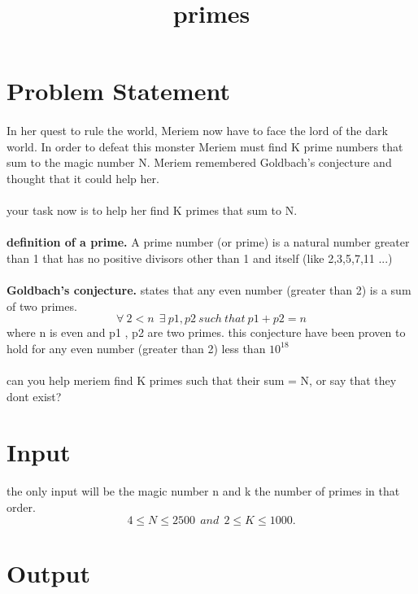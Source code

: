 \documentclass[10pt]{article}
\begin{document}
\title{primes}
 \date{}
\maketitle

\section{Problem Statement}
\paragraph{}
In her quest to rule the world, Meriem now have to face the lord of the dark world.
In order to defeat this monster Meriem must find K prime numbers that sum to the
magic number N. Meriem remembered Goldbach's conjecture and thought that it could help her.
\paragraph{}
your task now is to help her find K primes that sum to N.
\paragraph{}
\textbf{definition of a prime.}
A prime number (or prime) is a natural number greater than 1 that has no positive divisors other than 1 and itself
(like 2,3,5,7,11 ...)
\paragraph{}
\textbf{Goldbach's conjecture.} states that any even number (greater than 2) is a sum of two primes.
$$ \forall\ 2<n\ \ \exists\  p1,p2\ such\ that\  p1+p2=n $$
where n is even and p1 , p2 are two primes. 
this conjecture have been proven to hold for any even number (greater than 2) less than $10^{18}$
\paragraph{}
can you help meriem find K primes such that their sum = N, or say that they dont exist?
\section{Input}
the only input will be the magic number n and k the number of primes in that order.
$$4\le N \le 2500\ \  and\ \  2 \le K \le 1000.$$

\section{Output}
\end{document}
